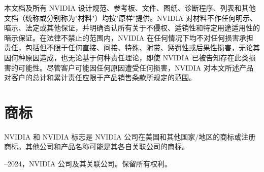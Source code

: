 \documentclass[11pt,UTF8,fontset=fandol,openany]{ctexrep}
\begin{document}
本文档及所有 NVIDIA 设计规范、参考板、文件、图纸、诊断程序、列表和其他文档（统称或分别称为"材料"）均按"原样"提供。NVIDIA 对材料不作任何明示、暗示、法定或其他保证，并明确否认所有关于不侵权、适销性和特定用途适用性的暗示保证。在法律不禁止的范围内，NVIDIA 在任何情况下均不对任何损害承担责任，包括但不限于任何直接、间接、特殊、附带、惩罚性或后果性损害，无论其因何种原因造成，也无论基于何种责任理论，即使 NVIDIA 已被告知存在此类损害的可能性。尽管客户可能因任何原因遭受任何损害，NVIDIA 对本文所述产品对客户的总计和累计责任应限于产品销售条款所规定的范围。

\section{商标}

NVIDIA 和 NVIDIA 标志是 NVIDIA 公司在美国和其他国家/地区的商标或注册商标。其他公司和产品名称可能是其各自关联公司的商标。

\vspace{2em}


\vspace{0.5em}
\noindent{}--2024，NVIDIA 公司及其关联公司。保留所有权利。
\end{document}
